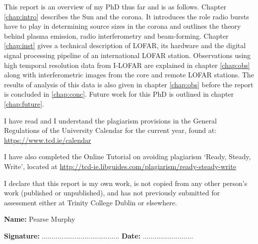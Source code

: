 \begin{abstracts}

This report is an overview of my PhD thus far and is as follows. Chapter \ref{chap:intro} describes the Sun and the corona. It introduces the role radio bursts have to play in determining source sizes in the corona and outlines the theory behind plasma emission, radio interferometry and beam-forming. Chapter \ref{chap:inst} gives a technical description of LOFAR, its hardware and the digital signal processing pipeline of an international LOFAR station. Observations using high temporal resolution data from I-LOFAR are explained in chapter \ref{chap:obs} along with interferometric images from the core and remote LOFAR stations. The results of analysis of this data is also given in chapter \ref{chap:obs} before the report is concluded in \ref{chap:conc}. Future work for this PhD is outlined in chapter \ref{chap:future}.
\end{abstracts}


\restoregeometry








\begin{declaration}      

I have read and I understand the plagiarism provisions in the General Regulations of the University Calendar for the current year, found at: \url{https://www.tcd.ie/calendar}

I have also completed the Online Tutorial on avoiding plagiarism ‘Ready, Steady, Write’, located at \url{http://tcd-ie.libguides.com/plagiarism/ready-steady-write}  

\vspace{10mm}

I declare that this report is my own work, is not copied from any other person's work (published or unpublished), and has not previously submitted for assessment either at Trinity College Dublin or elsewhere.

\vspace{30mm}

\textbf{Name:} Pearse Murphy

\vspace{15mm}

\textbf{Signature:}  ........................................		\textbf{Date:}  ..........................

\end{declaration}

